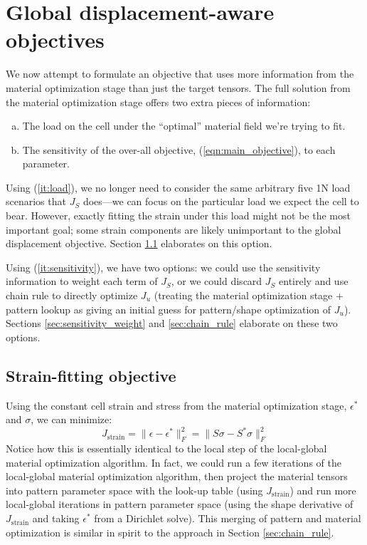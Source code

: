 \documentclass[10pt]{article}
\providecommand{\norm}[1]{\lVert#1\rVert}
\begin{document}
\section{Global displacement-aware objectives}
We now attempt to formulate an objective that uses more information from the
material optimization stage than just the target tensors. The full solution
from the material optimization stage offers two extra pieces of information:

\begin{enumerate}[(a)]
    \item The load on the cell under the ``optimal'' material field we're trying to fit.
          \label{it:load}
    \item The sensitivity of the over-all objective, (\ref{eqn:main_objective}),
          to each parameter.
          \label{it:sensitivity}
\end{enumerate}

Using (\ref{it:load}), we no longer need to consider the same arbitrary five 1N
load scenarios that $J_S$ does---we can focus on the particular load we expect
the cell to bear. However, exactly fitting the strain under this load might not
be the most important goal; some strain components are likely unimportant to
the global displacement objective. Section \ref{sec:strain_fit} elaborates on this option.

Using (\ref{it:sensitivity}), we have two options: we could use the sensitivity
information to weight each term of $J_S$, or we could discard $J_S$ entirely
and use chain rule to directly optimize $J_u$ (treating
the material optimization stage + pattern lookup as giving an initial guess for
pattern/shape optimization of $J_u$). Sections \ref{sec:sensitivity_weight}
and \ref{sec:chain_rule} elaborate on these two options.

\subsection{Strain-fitting objective}
\label{sec:strain_fit}
Using the constant cell strain and stress from the material optimization stage,
$\epsilon^*$ and $\sigma$, we can minimize:
$$
J_\text{strain} = \norm{\epsilon - \epsilon^*}^2_F = \norm{S \sigma - S^* \sigma}_F^2
$$
Notice how this is essentially identical to the local step of the local-global
material optimization algorithm. In fact, we could run a few iterations of the
local-global material optimization algorithm, then project the material tensors into
pattern parameter space with the look-up table (using $J_\text{strain}$) and
run more local-global iterations in pattern parameter space  (using the shape
derivative of $J_\text{strain}$ and taking $\epsilon^*$ from a Dirichlet
solve). This merging of pattern and material optimization is similar in spirit to
the approach in Section \ref{sec:chain_rule}.
\end{document}
